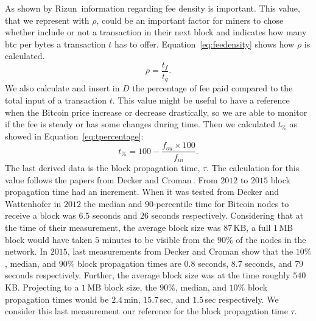 \documentclass[USenglish]{uit-thesis}
\begin{document}
As shown by Rizun\,\cite{Rizun:2015:blocksizelimit}
information regarding fee density is important.
This value, that we represent with
$\rho$, could be an important factor for miners
to chose whether include or not a transaction in their
next block and indicates how many \gls{btc} per bytes
a transaction $t$ has to offer. Equation~\ref{eq:feedensity}
shows how $\rho$ is calculated.
\begin{equation}
\label{eq:feedensity}
\rho = \frac{t_f}{t_q}.
\end{equation} 
We also calculate and insert in $D$ the percentage of fee paid
compared to the total input of a transaction $t$. This
value might be useful to have a reference when the
Bitcoin price increase or decrease drastically, so we are
able to monitor if the fee is steady or has some changes
during time. Then we calculated $t_\%$ as showed in
Equation~\ref{eq:tpercentage}:
\begin{equation}
\label{eq:tpercentage}
t_\% = 100 - \frac{f_{ou} \times 100}{f_{in}}.
\end{equation}
The last derived data is the block propagation time, $\tau$. The calculation
for this value follows the papers from Decker and
Croman\,\cite{Decker2013IPBN, croman2016}. From $2012$
to $2015$ block propagation time had an increment.
When it was tested from Decker and Wattenhofer in
$2012$ the median and $90$-percentile time for Bitcoin
nodes to receive a block was $6.5$ seconds and
$26$ seconds respectively. Considering that
at the time of their measurement, the average block size was $87$\,KB,
a full $1$\,MB block would have taken $5$ minutes to be
visible from the $90\%$ of the nodes in the network.
In $2015$, last measurements from Decker and Croman show
that the $10\%$, median, and $90\%$ block propagation times are
$0.8$ seconds, $8.7$ seconds, and $79$ seconds respectively.
Further, the average block size was at the time roughly $540$\,KB.
Projecting to a $1$\,MB block size, the $90\%$, median, and
$10\%$ block propagation times would be $2.4$\,min, $15.7$\,sec,
and $1.5$\,sec respectively. We consider this last measurement
our reference for the block propagation time $\tau$.

%
\end{document}
